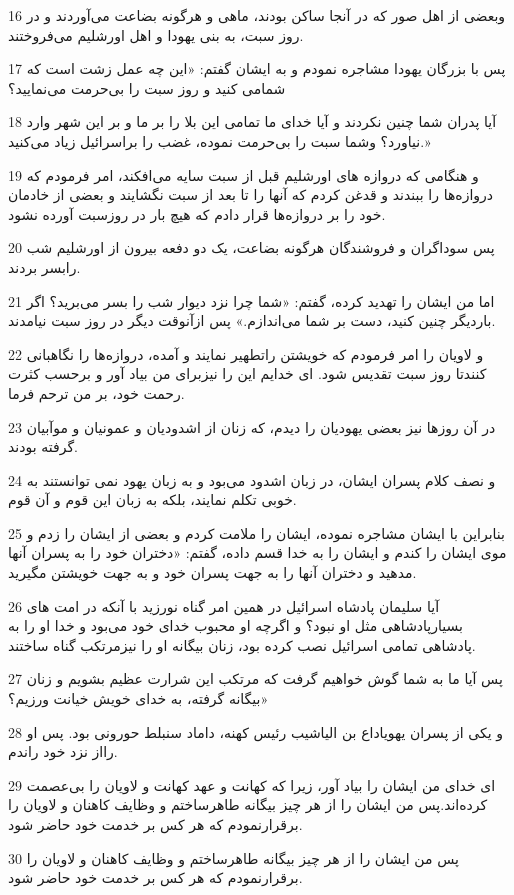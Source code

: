 \par 16 وبعضی از اهل صور که در آنجا ساکن بودند، ماهی و هرگونه بضاعت می‌آوردند و در روز سبت، به بنی یهودا و اهل اورشلیم می‌فروختند.
\par 17 پس با بزرگان یهودا مشاجره نمودم و به ایشان گفتم: «این چه عمل زشت است که شمامی کنید و روز سبت را بی‌حرمت می‌نمایید؟
\par 18 آیا پدران شما چنین نکردند و آیا خدای ما تمامی این بلا را بر ما و بر این شهر وارد نیاورد؟ وشما سبت را بی‌حرمت نموده، غضب را براسرائیل زیاد می‌کنید.»
\par 19 و هنگامی که دروازه های اورشلیم قبل از سبت سایه می‌افکند، امر فرمودم که دروازه‌ها را ببندند و قدغن کردم که آنها را تا بعد از سبت نگشایند و بعضی از خادمان خود را بر دروازه‌ها قرار دادم که هیچ بار در روزسبت آورده نشود.
\par 20 پس سوداگران و فروشندگان هرگونه بضاعت، یک دو دفعه بیرون از اورشلیم شب رابسر بردند.
\par 21 اما من ایشان را تهدید کرده، گفتم: «شما چرا نزد دیوار شب را بسر می‌برید؟ اگر باردیگر چنین کنید، دست بر شما می‌اندازم.» پس ازآنوقت دیگر در روز سبت نیامدند.
\par 22 و لاویان را امر فرمودم که خویشتن راتطهیر نمایند و آمده، دروازه‌ها را نگاهبانی کنندتا روز سبت تقدیس شود. ای خدایم این را نیزبرای من بیاد آور و برحسب کثرت رحمت خود، بر من ترحم فرما.
\par 23 در آن روزها نیز بعضی یهودیان را دیدم، که زنان از اشدودیان و عمونیان و موآبیان گرفته بودند.
\par 24 و نصف کلام پسران ایشان، در زبان اشدود می‌بود و به زبان یهود نمی توانستند به خوبی تکلم نمایند، بلکه به زبان این قوم و آن قوم.
\par 25 بنابراین با ایشان مشاجره نموده، ایشان را ملامت کردم و بعضی از ایشان را زدم و موی ایشان را کندم و ایشان را به خدا قسم داده، گفتم: «دختران خود را به پسران آنها مدهید و دختران آنها را به جهت پسران خود و به جهت خویشتن مگیرید.
\par 26 آیا سلیمان پادشاه اسرائیل در همین امر گناه نورزید با آنکه در امت های بسیارپادشاهی مثل او نبود؟ و اگر‌چه او محبوب خدای خود می‌بود و خدا او را به پادشاهی تمامی اسرائیل نصب کرده بود، زنان بیگانه او را نیزمرتکب گناه ساختند.
\par 27 پس آیا ما به شما گوش خواهیم گرفت که مرتکب این شرارت عظیم بشویم و زنان بیگانه گرفته، به خدای خویش خیانت ورزیم؟»
\par 28 و یکی از پسران یهویاداع بن الیاشیب رئیس کهنه، داماد سنبلط حورونی بود. پس او رااز نزد خود راندم.
\par 29 ‌ای خدای من ایشان را بیاد آور، زیرا که کهانت و عهد کهانت و لاویان را بی‌عصمت کرده‌اند.پس من ایشان را از هر چیز بیگانه طاهرساختم و وظایف کاهنان و لاویان را برقرارنمودم که هر کس بر خدمت خود حاضر شود.
\par 30 پس من ایشان را از هر چیز بیگانه طاهرساختم و وظایف کاهنان و لاویان را برقرارنمودم که هر کس بر خدمت خود حاضر شود.


